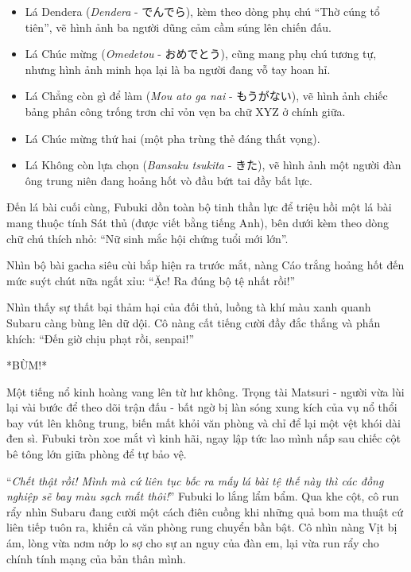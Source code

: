 \documentclass[../main.tex]{subfiles}
\begin{document}
\begin{itemize}
  \item Lá Dendera (\textit{Dendera} - でんでら), kèm theo dòng phụ chú ``Thờ cúng tổ tiên'', vẽ hình ảnh ba người dũng cảm cầm súng lên chiến đấu.
  \item Lá Chúc mừng (\textit{Omedetou} - おめでとう), cũng mang phụ chú tương tự, nhưng hình ảnh minh họa lại là ba người đang vỗ tay hoan hỉ.
  \item Lá Chẳng còn gì để làm (\textit{Mou ato ga nai} - もうがない), vẽ hình ảnh chiếc bảng phân công trống trơn chỉ vỏn vẹn ba chữ XYZ ở chính giữa.
  \item Lá Chúc mừng thứ hai (một pha trùng thẻ đáng thất vọng).
  \item Lá Không còn lựa chọn (\textit{Bansaku tsukita} - きた), vẽ hình ảnh một người đàn ông trung niên đang hoảng hốt vò đầu bứt tai đầy bất lực.
\end{itemize}


Đến lá bài cuối cùng, Fubuki dồn toàn bộ tinh thần lực để triệu hồi một lá bài mang thuộc tính Sát thủ (được viết bằng tiếng Anh), bên dưới kèm theo dòng chữ chú thích nhỏ: ``Nữ sinh mắc hội chứng tuổi mới lớn''.

Nhìn bộ bài gacha siêu cùi bắp hiện ra trước mắt, nàng Cáo trắng hoảng hốt đến mức suýt chút nữa ngất xỉu: ``Ặc! Ra đúng bộ tệ nhất rồi!''

Nhìn thấy sự thất bại thảm hại của đối thủ, luồng tà khí màu xanh quanh Subaru càng bùng lên dữ dội. Cô nàng cất tiếng cười đầy đắc thắng và phấn khích: ``Đến giờ chịu phạt rồi, senpai!''

*BÙM!*

Một tiếng nổ kinh hoàng vang lên từ hư không. Trọng tài Matsuri - người vừa lùi lại vài bước để theo dõi trận đấu - bất ngờ bị làn sóng xung kích của vụ nổ thổi bay vút lên không trung, biến mất khỏi văn phòng và chỉ để lại một vệt khói dài đen sì. Fubuki tròn xoe mắt vì kinh hãi, ngay lập tức lao mình nấp sau chiếc cột bê tông lớn giữa phòng để tự bảo vệ.

``\textit{Chết thật rồi! Mình mà cứ liên tục bốc ra mấy lá bài tệ thế này thì các đồng nghiệp sẽ bay màu sạch mất thôi!}'' Fubuki lo lắng lẩm bẩm. Qua khe cột, cô run rẩy nhìn Subaru đang cười một cách điên cuồng khi những quả bom ma thuật cứ liên tiếp tuôn ra, khiến cả văn phòng rung chuyển bần bật. Cô nhìn nàng Vịt bị ám, lòng vừa nơm nớp lo sợ cho sự an nguy của đàn em, lại vừa run rẩy cho chính tính mạng của bản thân mình.
\end{document}
